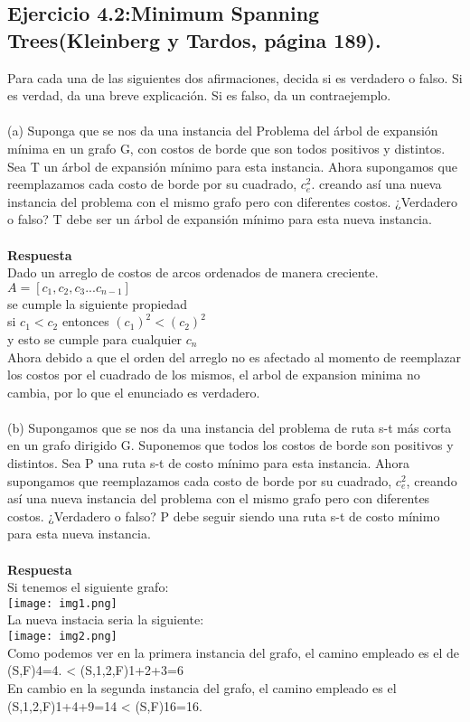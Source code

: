 \documentclass[a4paper,12pt]{article}
\begin{document}
\subsection{Ejercicio 4.2:Minimum Spanning Trees(Kleinberg y Tardos, página 189).}
Para cada una de las siguientes dos afirmaciones, decida si es verdadero o falso. Si es verdad, da una breve explicación. Si es falso, da un contraejemplo.\\\\
(a) Suponga que se nos da una instancia del Problema del árbol de expansión mínima en un grafo G, con costos de borde que son todos positivos y distintos. Sea T un árbol de expansión mínimo para esta instancia. Ahora supongamos que reemplazamos cada costo de borde por su cuadrado, $c^{2}_{e}$. creando así una nueva instancia del problema con el mismo grafo pero con diferentes costos. ¿Verdadero o falso? T debe ser un árbol de expansión mínimo para esta nueva instancia.\\\\
\textbf{Respuesta}\\
Dado un arreglo de costos de arcos ordenados de manera creciente.\\
$A = [c_1,c_2,c_3...c_{n-1}]$\\
se cumple la siguiente propiedad\\
si $c_1 < c_2$ entonces $(c_1)^2 < (c_2)^2$\\
y esto se cumple para cualquier $c_n$\\
Ahora debido a que el orden del arreglo no es afectado al momento de reemplazar los costos por el cuadrado de los mismos, el arbol de expansion minima no cambia, por lo que el enunciado es verdadero.\\\\
(b) Supongamos que se nos da una instancia del problema de ruta s-t más corta en un grafo dirigido G. Suponemos que todos los costos de borde son positivos y distintos. Sea P una ruta s-t de costo mínimo para esta instancia. Ahora supongamos que reemplazamos cada costo de borde por su cuadrado, $c^{2}_{e}$, creando así una nueva instancia del problema con el mismo grafo pero con diferentes costos. ¿Verdadero o falso? P debe seguir siendo una ruta s-t de costo mínimo para esta nueva instancia.\\\\
\textbf{Respuesta}\\
Si tenemos el siguiente grafo:\\
\texttt{[image: img1.png]}\\
La nueva instacia seria la siguiente:\\
\texttt{[image: img2.png]}\\
Como podemos ver en la primera instancia del grafo, el camino empleado es el de (S,F)4=4. < (S,1,2,F)1+2+3=6\\
En cambio en la segunda instancia del grafo, el camino empleado es el\\
(S,1,2,F)1+4+9=14 < (S,F)16=16.\\\\
\end{document}
